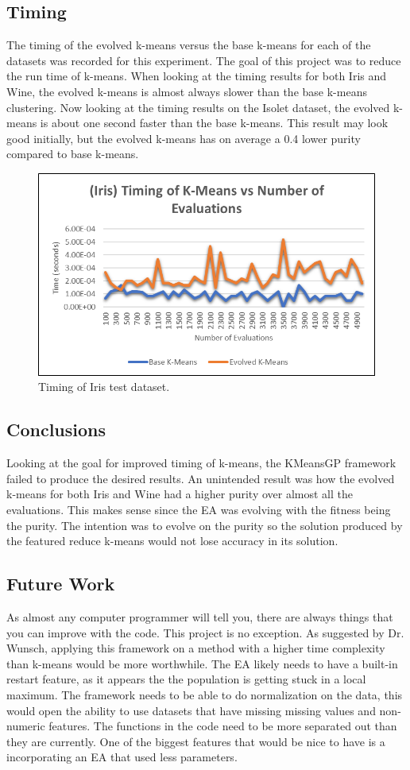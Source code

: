 \documentclass[conference]{IEEEtran}
\begin{document}
\subsection{Timing}
The timing of the evolved k-means versus the base k-means for each of the datasets was recorded for this experiment.  The goal of this project was to reduce the run time of k-means.  When looking at the timing results for both Iris and Wine, the evolved k-means is almost always slower than the base k-means clustering.  Now looking at the timing results on the Isolet dataset, the evolved k-means is about one second faster than the base k-means.  This result may look good initially, but the evolved k-means has on average a 0.4 lower purity compared to base k-means.
\begin{figure}[H]
\begin{center}
\includegraphics[width=0.7\columnwidth]{iristiming.png}
\caption{Timing of Iris test dataset.}
\end{center}
\label{fig}
\end{figure}

\subsection{Conclusions}
Looking at the goal for improved timing of k-means, the KMeansGP framework failed to produce the desired results.  An unintended result was how the evolved k-means for both Iris and Wine had a higher purity over almost all the evaluations.  This makes sense since the EA was evolving with the fitness being the purity.  The intention was to evolve on the purity so the solution produced by the featured reduce k-means would not lose accuracy in its solution.
\subsection{Future Work}
As almost any computer programmer will tell you, there are always things that you can improve with the code.  This project is no exception.  As suggested by Dr. Wunsch, applying this framework on a method with a higher time complexity than k-means would be more worthwhile.  The EA likely needs to have a built-in restart feature, as it appears the the population is getting stuck in a local maximum.  The framework needs to be able to do normalization on the data, this would open the ability to use datasets that have missing missing values and non-numeric features.  The functions in the code need to be more separated out than they are currently.  One of the biggest features that would be nice to have is a incorporating an EA that used less parameters.     
\clearpage
\end{document}
